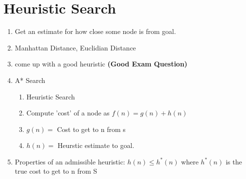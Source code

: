 \documentclass{article}
\begin{document}
\section{Heuristic Search}
\begin{enumerate}
	\item Get an estimate for how close some node is from goal.
	\item Manhattan Distance, Euclidian Distance
	\item come up with a good heuristic \textbf{(Good Exam Question)}
	\item A* Search
	\begin{enumerate}
		\item Heuristic Search
		\item Compute 'cost' of a node as $f(n) = g(n) + h(n)$
		\item $g(n) = $ Cost to get to n from s
		\item $h(n) = $ Heurstic estimate to goal.
	\end{enumerate}
	\item Properties of an admissible heuristic: $h(n) \leq h^*(n)$ where $h^*(n)$
		is the true cost to get to n from S
\end{enumerate}
\end{document}
